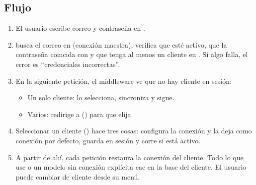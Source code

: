 \documentclass[11pt]{article}
\begin{document}
\subsection{Flujo}
\begin{enumerate}[leftmargin=1.4em,itemsep=2pt]
  \item El usuario escribe correo y contrase\~na en .
  \item {} busca el correo en  (conexi\'on maestra), verifica que est\'e activo, que la contrase\~na coincida con  y que tenga al menos un cliente en . Si algo falla, el error es ``credenciales incorrectas''.
  \item En la siguiente petici\'on, el middleware  ve que no hay cliente en sesi\'on:
  \begin{itemize}[leftmargin=1.2em,itemsep=1pt]
    \item Un solo cliente: lo selecciona, sincroniza y sigue.
    \item Varios: redirige a  () para que elija.
  \end{itemize}
  \item Seleccionar un cliente () hace tres cosas: configura la conexi\'on  y la deja como conexi\'on por defecto, guarda  en sesi\'on y corre  si  est\'a activo.
  \item A partir de ah\'i, cada petici\'on restaura la conexi\'on del cliente. Todo lo que use  o un modelo sin conexi\'on expl\'icita cae en la base del cliente. El usuario puede cambiar de cliente desde su men\'u.
\end{enumerate}
\end{document}
